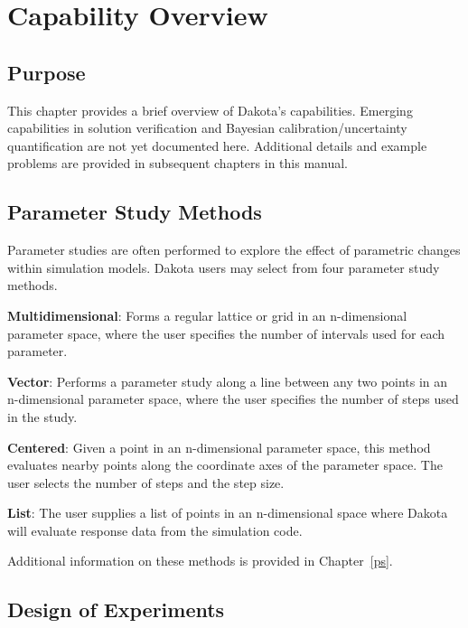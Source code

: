 \chapter{Capability Overview}\label{capabilities}

\section{Purpose}\label{capabilities:purpose}

This chapter provides a brief overview of Dakota's capabilities.
Emerging capabilities in solution verification and Bayesian
calibration/uncertainty quantification are not yet documented here.
Additional details and example problems are provided in subsequent
chapters in this manual.

\section{Parameter Study Methods}\label{capabilities:parameter}

Parameter studies are often performed to explore the effect of
parametric changes within simulation models. Dakota users may select
from four parameter study methods.

\textbf{Multidimensional}: Forms a regular lattice or grid in an
n-dimensional parameter space, where the user specifies the number of
intervals used for each parameter.

\textbf{Vector}: Performs a parameter study along a line between any two
points in an n-dimensional parameter space, where the user specifies
the number of steps used in the study.

\textbf{Centered}: Given a point in an n-dimensional parameter space,
this method evaluates nearby points along the coordinate axes of the
parameter space. The user selects the number of steps and the step
size.

\textbf{List}: The user supplies a list of points in an n-dimensional
space where Dakota will evaluate response data from the simulation
code.

Additional information on these methods is provided in Chapter~\ref{ps}.

\section{Design of Experiments}\label{capabilities:sampling}

